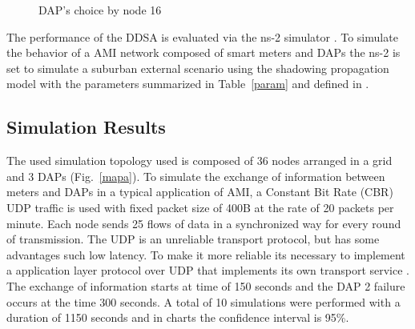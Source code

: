 \documentclass[conference]{IEEEtran}
\begin{document}
\begin{figure}[ht]
{    
  }
  \caption{DAP's choice by node 16}
  \label{n16-dap2}
\end{figure}




The performance of the DDSA is evaluated via the ns-2 simulator \cite{ns-2:13}. 
To simulate the behavior of a AMI network composed of  smart meters and DAPs the ns-2 is set to simulate a suburban external scenario using the shadowing propagation model with the parameters summarized in Table~\ref{param} and defined in \cite{Plan2011}.







\subsection{Simulation Results}


The used simulation topology used is composed of 36 nodes arranged in a grid and 3 DAPs (Fig.~\ref{mapa}). To simulate the exchange of information between meters and DAPs in a typical application of AMI, a Constant Bit Rate (CBR) UDP traffic is used with fixed packet size of 400B \cite{Plan2011} at the rate of 20 packets per minute. Each node sends 25 flows of data in a synchronized way for every round of transmission. The UDP is an unreliable transport protocol, but has some advantages such low latency. To make it more reliable its necessary to implement a application layer protocol over UDP that implements its own transport service \cite{RFC6272}. The exchange of information starts at time of 150 seconds and the DAP 2 failure occurs  at the time 300 seconds. A total of 10 simulations were performed with a duration of 1150 seconds and in charts the confidence interval is 95\%.
\end{document}
